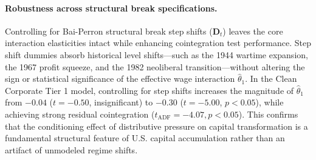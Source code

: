 \paragraph{Robustness across structural break specifications.}
Controlling for Bai-Perron structural break step shifts ($\mathbf{D}_t$) leaves the core interaction elasticities intact while enhancing cointegration test performance. Step shift dummies absorb historical level shifts---such as the 1944 wartime expansion, the 1967 profit squeeze, and the 1982 neoliberal transition---without altering the sign or statistical significance of the effective wage interaction $\hat{\theta}_1$. In the Clean Corporate Tier 1 model, controlling for step shifts increases the magnitude of $\hat{\theta}_1$ from $-0.04$ ($t = -0.50$, insignificant) to $-0.30$ ($t = -5.00$, $p < 0.05$), while achieving strong residual cointegration ($t_{\text{ADF}} = -4.07, p < 0.05$). This confirms that the conditioning effect of distributive pressure on capital transformation is a fundamental structural feature of U.S. capital accumulation rather than an artifact of unmodeled regime shifts.


